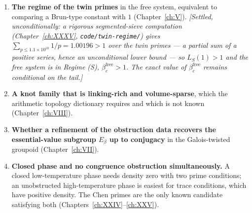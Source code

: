 \begin{enumerate}
{      coaction; (b) the Galois descent from the Hilbert class
      field --- Chapter~\ref{ch:XXXII} now proves the full class group emerges as the
      group of descent obstructions $\Cl_K\hookrightarrow H^1(G,\mathcal O_H^\times)$,
      with the ladder $\mathrm{ord}[1]=q^h-1$ (bottom) and $q^{|\Cl_K|}-1$ (top), and
      reduces the equivariant K-theory to the inert local model crossed by $\Z/h$; the
      integral computation of that reduction is now carried out for the first inert case
      in Chapter~\ref{ch:XXXVIII} (exact torsion by Smith forms, the unit class split by
      $\tfrac{1\pm U_\sigma}2$ into a pair of order-$8$ classes, and the entanglement
      law: the class group doubles only the non-induced strata); remaining there are the
      twisted character bookkeeping and the degree-four extension data; (c) the
      several-prime case, where the definable scalings are the kernel of
      $\Z^S\to\Cl_K$; plus the extension data for $n\ge3$ and the $q$-primary
      bookkeeping from Chapter~\ref{ch:XXX}.]} Also open:
      $H^1_{\mathrm{meas}}(\mathcal R_S,\pi_\beta;\T)$ itself rather
      than its kernel (Chapter~\ref{ch:III}). \emph{[Settled in the correct sense by
      Chapter~\ref{ch:XXXIX}: the group is non-smooth and its coboundary action is
      turbulent, so no classification by countable structures exists; the complete
      smooth residue is the Mackey-range spectrum; the arithmetic embeds as
      $\widehat{G_S}/\Xi_\beta$, the unique equicontinuous thread, while the ambient
      group is orbit-equivalence amnesiac. Remaining: the flagged turbulence lemma and
      noncompact coefficients.]}
\item \textbf{The regime of the twin primes} in the free system, equivalent to comparing a
      Brun-type constant with $1$ (Chapter~\ref{ch:V}).
      \emph{[Settled, unconditionally: a rigorous segmented-sieve computation
      (Chapter~\ref{ch:XXXV}, \texttt{code/twin-regime/}) gives $\sum_{p\le1.1\times10^{10}}1/p=1.00196>1$
      over the twin primes --- a partial sum of a positive series, hence an unconditional
      lower bound --- so $L_{S}(1)>1$ and the free system is in Regime (S),
      $\beta_c^{\mathrm{free}}>1$. The exact value of $\beta_c^{\mathrm{free}}$ remains
      conditional on the tail.]}
\item \textbf{A knot family that is linking-rich and volume-sparse}, which the arithmetic
      topology dictionary requires and which is not known (Chapter~\ref{ch:VIII}).
\item \textbf{Whether a refinement of the obstruction data recovers the essential-value
      subgroup $E_\beta$ up to conjugacy} in the Galois-twisted groupoid
      (Chapter~\ref{ch:VII}).
\item \textbf{Closed phase and no congruence obstruction simultaneously.} A closed
      low-temperature phase needs density zero with two prime conditions; an unobstructed
      high-temperature phase is easiest for trace conditions, which have positive density.
      The Chen primes are the only known candidate satisfying both
      (Chapters~\ref{ch:XXIV}--\ref{ch:XXV}).
\end{enumerate}


